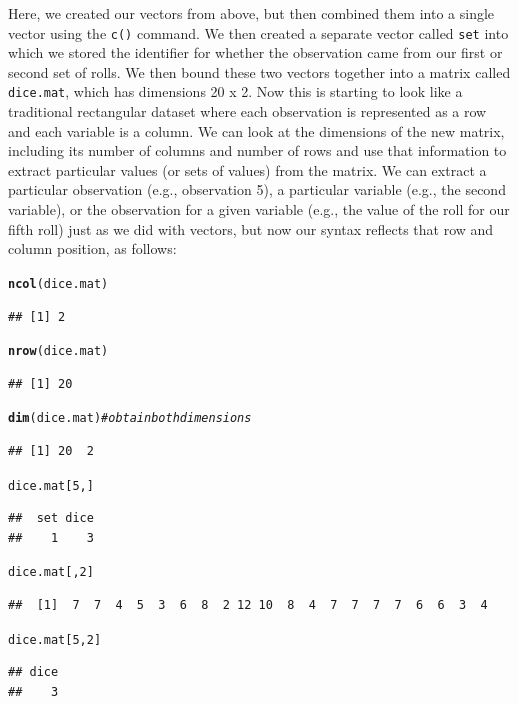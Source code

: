 \documentclass[12pt]{article}\usepackage[]{graphicx}\usepackage[]{color}
\makeatletter
\newcommand{\hlnum}[1]{\textcolor[rgb]{0.686,0.059,0.569}{#1}}%
\newcommand{\hlcom}[1]{\textcolor[rgb]{0.678,0.584,0.686}{\textit{#1}}}%
\newcommand{\hlstd}[1]{\textcolor[rgb]{0.345,0.345,0.345}{#1}}%
\newcommand{\hlkwd}[1]{\textcolor[rgb]{0.737,0.353,0.396}{\textbf{#1}}}%
\newenvironment{kframe}{%
 \def\at@end@of@kframe{}%
 \ifinner\ifhmode%
  \def\at@end@of@kframe{\end{minipage}}%
  \begin{minipage}{\columnwidth}%
 \fi\fi%
 \def\FrameCommand##1{\hskip\@totalleftmargin \hskip-\fboxsep
 \colorbox{shadecolor}{##1}\hskip-\fboxsep
     \hskip-\linewidth \hskip-\@totalleftmargin \hskip\columnwidth}%
 \MakeFramed {\advance\hsize-\width
   \@totalleftmargin\z@ \linewidth\hsize
   \@setminipage}}%
 {\par\unskip\endMakeFramed%
 \at@end@of@kframe}
\newenvironment{knitrout}{}{} %
\makeatother
\begin{document}
Here, we created our vectors from above, but then combined them into a single vector using the \texttt{c()} command. We then created a separate vector called \texttt{set} into which we stored the identifier for whether the observation came from our first or second set of rolls. We then bound these two vectors together into a matrix called \texttt{dice.mat}, which has dimensions 20 x 2. Now this is starting to look like a traditional rectangular dataset where each observation is represented as a row and each variable is a column. We can look at the dimensions of the new matrix, including its number of columns and number of rows and use that information to extract particular values (or sets of values) from the matrix. We can extract a particular observation (e.g., observation 5), a particular variable (e.g., the second variable), or the observation for a given variable (e.g., the value of the roll for our fifth roll) just as we did with vectors, but now our syntax reflects that row and column position, as follows:
\begin{knitrout}
\color{fgcolor}\begin{kframe}
\begin{alltt}
\hlkwd{ncol}\hlstd{(dice.mat)}
\end{alltt}
\begin{verbatim}
## [1] 2
\end{verbatim}
\begin{alltt}
\hlkwd{nrow}\hlstd{(dice.mat)}
\end{alltt}
\begin{verbatim}
## [1] 20
\end{verbatim}
\begin{alltt}
\hlkwd{dim}\hlstd{(dice.mat)} \hlcom{#obtain both dimensions}
\end{alltt}
\begin{verbatim}
## [1] 20  2
\end{verbatim}
\begin{alltt}
\hlstd{dice.mat[}\hlnum{5}\hlstd{,]}
\end{alltt}
\begin{verbatim}
##  set dice 
##    1    3
\end{verbatim}
\begin{alltt}
\hlstd{dice.mat[,}\hlnum{2}\hlstd{]}
\end{alltt}
\begin{verbatim}
##  [1]  7  7  4  5  3  6  8  2 12 10  8  4  7  7  7  7  6  6  3  4
\end{verbatim}
\begin{alltt}
\hlstd{dice.mat[}\hlnum{5}\hlstd{,}\hlnum{2}\hlstd{]}
\end{alltt}
\begin{verbatim}
## dice 
##    3
\end{verbatim}
\end{kframe}
\end{knitrout}
\end{document}
